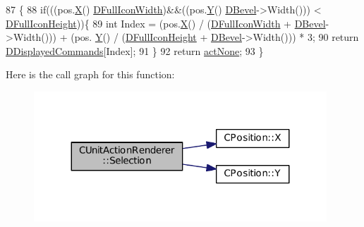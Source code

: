 \begin{DoxyCode}
87                                                                              \{
88     \textcolor{keywordflow}{if}(((pos.\hyperlink{classCPosition_a9a6b94d3b91df1492d166d9964c865fc}{X}() %
      \hyperlink{classCUnitActionRenderer_a67e5c1650ef8f849c05d9f059d12fb95}{DFullIconWidth})&&((pos.\hyperlink{classCPosition_a1aa8a30e2f08dda1f797736ba8c13a87}{Y}() %
      \hyperlink{classCUnitActionRenderer_a3f4012557f7f4d71cfa02df725984ebb}{DBevel}->Width())) < \hyperlink{classCUnitActionRenderer_a11b30763b92ed0cbfb842f86fe76fe26}{DFullIconHeight}))\{
89         \textcolor{keywordtype}{int} Index = (pos.\hyperlink{classCPosition_a9a6b94d3b91df1492d166d9964c865fc}{X}() / (\hyperlink{classCUnitActionRenderer_a67e5c1650ef8f849c05d9f059d12fb95}{DFullIconWidth} + \hyperlink{classCUnitActionRenderer_a3f4012557f7f4d71cfa02df725984ebb}{DBevel}->Width())) + (pos.
      \hyperlink{classCPosition_a1aa8a30e2f08dda1f797736ba8c13a87}{Y}() / (\hyperlink{classCUnitActionRenderer_a11b30763b92ed0cbfb842f86fe76fe26}{DFullIconHeight} + \hyperlink{classCUnitActionRenderer_a3f4012557f7f4d71cfa02df725984ebb}{DBevel}->Width())) * 3;
90         \textcolor{keywordflow}{return} \hyperlink{classCUnitActionRenderer_a194c87c9f3280485f4abceb8d39853b3}{DDisplayedCommands}[Index];
91     \}
92     \textcolor{keywordflow}{return} \hyperlink{GameDataTypes_8h_a35b98ce26aca678b03c6f9f76e4778ceaa8df154ad276f6f62054e9b5b0696f92}{actNone};
93 \}
\end{DoxyCode}
Here is the call graph for this function\+:\nopagebreak
\begin{figure}[H]
\begin{center}
\leavevmode
\includegraphics[width=311pt]{classCUnitActionRenderer_a41108fd092035a22f7ecd75b18f045a7_cgraph}
\end{center}
\end{figure}


